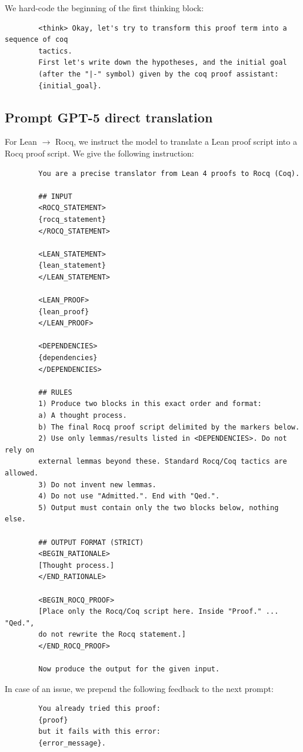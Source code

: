 \documentclass{article}
\theoremstyle{plain}
\theoremstyle{definition}
\theoremstyle{remark}
\begin{document}
	We hard-code the beginning of the first thinking block:
	\begin{verbatim}
		<think> Okay, let's try to transform this proof term into a sequence of coq
		tactics.
		First let's write down the hypotheses, and the initial goal
		(after the "|-" symbol) given by the coq proof assistant:
		{initial_goal}.
	\end{verbatim}
	
	\subsection{Prompt GPT-5 direct translation}
	\label{app:promptgpt}
	For Lean $\to$ Rocq, we instruct the model to translate a Lean proof script into a Rocq proof script. We give the following instruction:
        \begin{small}
	\begin{verbatim}
		You are a precise translator from Lean 4 proofs to Rocq (Coq).
		
		## INPUT
		<ROCQ_STATEMENT>
		{rocq_statement}
		</ROCQ_STATEMENT>
		
		<LEAN_STATEMENT>
		{lean_statement}
		</LEAN_STATEMENT>
		
		<LEAN_PROOF>
		{lean_proof}
		</LEAN_PROOF>
		
		<DEPENDENCIES>
		{dependencies}
		</DEPENDENCIES>
		
		## RULES
		1) Produce two blocks in this exact order and format:
		a) A thought process.
		b) The final Rocq proof script delimited by the markers below.
		2) Use only lemmas/results listed in <DEPENDENCIES>. Do not rely on
		external lemmas beyond these. Standard Rocq/Coq tactics are allowed.
		3) Do not invent new lemmas.
		4) Do not use "Admitted.". End with "Qed.".
		5) Output must contain only the two blocks below, nothing else.
		
		## OUTPUT FORMAT (STRICT)
		<BEGIN_RATIONALE>
		[Thought process.]
		</END_RATIONALE>
		
		<BEGIN_ROCQ_PROOF>
		[Place only the Rocq/Coq script here. Inside "Proof." ... "Qed.",
		do not rewrite the Rocq statement.]
		</END_ROCQ_PROOF>
		
		Now produce the output for the given input.
	\end{verbatim}
	        \end{small}

	In case of an issue, we prepend the following feedback to the next prompt:
        \begin{small}
	\begin{verbatim}
		You already tried this proof:
		{proof}
		but it fails with this error:
		{error_message}.
	\end{verbatim}
        \end{small}
	
\end{document}
